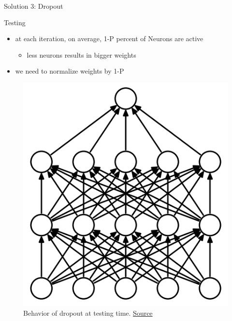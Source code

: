 \begin{frame}{Solution 3: Dropout}
	\begin{block}{Testing}
		\begin{itemize}
			\item at each iteration, on average, 1-P percent of Neurons are active
			\begin{itemize}
				\item less neurons results in bigger weights
			\end{itemize}
			\item we need to normalize weights by 1-P
		\end{itemize}
		
		\begin{figure}[H]
			\centering
			\includegraphics[height=0.4\textheight]{Figs/Dropout-before.png}
			\caption{Behavior of dropout at testing time. \href{https://www.cs.toronto.edu/~hinton/absps/JMLRdropout.pdf}{Source}}
		\end{figure}
	\end{block}
\end{frame}
